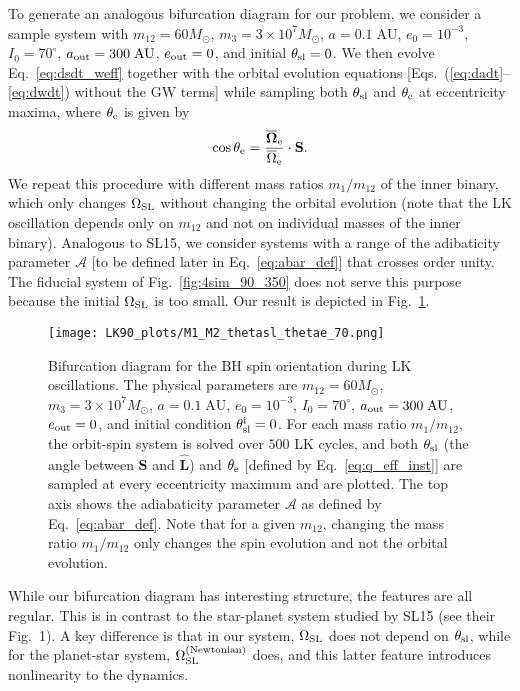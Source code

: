 \documentclass[
        twocolumn,
        twocolappendix
    ]{aastex63}
\renewcommand*{\bm}[1]{\boldsymbol{\mathbf{#1}}}
\newcommand*{\uv}[1]{\hat{\bm{#1}}}
\begin{document}
To generate an analogous bifurcation diagram for our problem, we consider a
sample system with $m_{12} = 60M_{\odot}$, $m_3 = 3 \times 10^7 M_{\odot}$, $a =
0.1\;\mathrm{AU}$, $e_0 = 10^{-3}$, $I_0 = 70^\circ$, $a_{\rm out} =
300\;\mathrm{AU}$, $e_{\rm out} = 0$, and initial $\theta_{\rm sl} = 0$. We then
evolve Eq.~\eqref{eq:dsdt_weff} together with the orbital evolution equations
[Eqs.~(\ref{eq:dadt}--\ref{eq:dwdt}) without the GW terms] while sampling both
$\theta_{\rm sl}$ and $\theta_{\rm e}$ at eccentricity maxima, where
$\theta_{\rm e}$ is given by
\begin{equation}
    \cos \theta_{\rm e} = \frac{\bm{\overline{\Omega}}_{\rm e}}{
        \overline{\Omega}_{\rm e}}\cdot \bm{S}.\label{eq:q_eff_inst}
\end{equation}
We repeat this procedure with different mass ratios $m_1 / m_{12}$ of the inner
binary, which only changes $\Omega_{\rm SL}$ without changing the orbital
evolution (note that the LK oscillation depends only on $m_{12}$ and not on
individual masses of the inner binary). Analogous to SL15, we consider systems
with a range of the adibaticity parameter $\mathcal{A}$ [to be defined later in
Eq.~\eqref{eq:abar_def}] that crosses order unity. The fiducial system of
Fig.~\ref{fig:4sim_90_350} does not serve this purpose because the initial
$\Omega_{\rm SL}$ is too small. Our result is depicted in
Fig.~\ref{fig:bifurcation_70}.
\begin{figure}
    \centering
    \texttt{[image: LK90\_plots/M1\_M2\_thetasl\_thetae\_70.png]}
    \caption{Bifurcation diagram for the BH spin orientation during LK
    oscillations. The physical parameters are $m_{12} = 60M_{\odot}$, $m_3 = 3
    \times 10^7 M_{\odot}$, $a = 0.1\;\mathrm{AU}$, $e_0 = 10^{-3}$, $I_0 =
    70^\circ$, $a_{\rm out} = 300\;\mathrm{AU}$, $e_{\rm out} = 0$, and initial
    condition $\theta_{\rm sl}^{\rm i} = 0$. For each mass ratio $m_1 / m_{12}$,
    the orbit-spin system is solved over $500$ LK cycles, and both $\theta_{\rm
    sl}$ (the angle between $\bm{S}$ and $\uv{L}$) and $\theta_{\rm e}$ [defined
    by Eq.~\eqref{eq:q_eff_inst}] are sampled at every eccentricity maximum and
    are plotted. The top axis shows the adiabaticity parameter $\mathcal{A}$ as
    defined by Eq.~\eqref{eq:abar_def}. Note that for a given $m_{12}$, changing
    the mass ratio $m_1 / m_{12}$ only changes the spin evolution and not the
    orbital evolution.}\label{fig:bifurcation_70}
\end{figure}

While our bifurcation diagram has interesting structure, the features are all
regular. This is in contrast to the star-planet system studied by SL15 (see
their Fig.~1). A key difference is that in our system, $\Omega_{\rm SL}$ does
not depend on $\theta_{\rm sl}$, while for the planet-star system, $\Omega_{\rm
SL}^{\rm (Newtonian)}$ does, and this latter feature introduces nonlinearity to
the dynamics.
\end{document}
